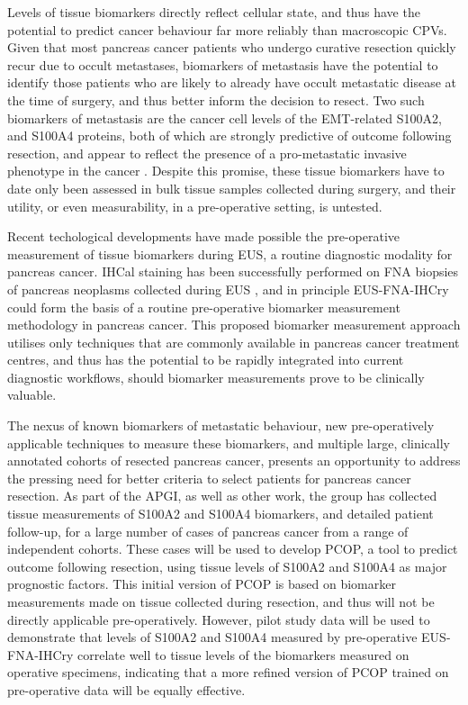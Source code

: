 \documentclass[dissertation.tex]{subfiles}
\begin{document}
Levels of tissue biomarkers directly reflect cellular state, and thus have the potential to predict cancer behaviour far more reliably than macroscopic \glspl{CPV}.  Given that most pancreas cancer patients who undergo curative resection quickly recur due to occult metastases, biomarkers of metastasis have the potential to identify those patients who are likely to already have occult metastatic disease at the time of surgery, and thus better inform the decision to resect.  Two such biomarkers of metastasis are the cancer cell levels of the \gls{EMT}-related S100A2, and S100A4 proteins, both of which are strongly predictive of outcome following resection, and appear to reflect the presence of a pro-metastatic invasive phenotype in the cancer \cite{Biankin2008, Tsukamoto2013, Lee2014}.  Despite this promise, these tissue biomarkers have to date only been assessed in bulk tissue samples collected during surgery, and their utility, or even measurability, in a pre-operative setting, is untested.

Recent techological developments have made possible the pre-operative measurement of tissue biomarkers during \gls{EUS}, a routine diagnostic modality for pancreas cancer.  \Gls{IHCal} staining has been successfully performed on \gls{FNA} biopsies of pancreas neoplasms collected during \gls{EUS} \cite{Popescu2012, Salla2009, Stelow2005}, and in principle \gls{EUS}-\gls{FNA}-\acrshort{IHCry} could form the basis of a routine pre-operative biomarker measurement methodology in pancreas cancer.  This proposed biomarker measurement approach utilises only techniques that are commonly available in pancreas cancer treatment centres, and thus has the potential to be rapidly integrated into current diagnostic workflows, should biomarker measurements prove to be clinically valuable.

The nexus of known biomarkers of metastatic behaviour, new pre-operatively applicable techniques to measure these biomarkers, and multiple large, clinically annotated cohorts of resected pancreas cancer, presents an opportunity to address the pressing need for better criteria to select patients for pancreas cancer resection.  As part of the \gls{APGI}, as well as other work, the group has collected tissue measurements of S100A2 and S100A4 biomarkers, and detailed patient follow-up, for a large number of cases of pancreas cancer from a range of independent cohorts.  These cases will be used to develop \gls{PCOP}, a tool to predict outcome following resection, using tissue levels of S100A2 and S100A4 as major prognostic factors.  This initial version of \gls{PCOP} is based on biomarker measurements made on tissue collected during resection, and thus will not be directly applicable pre-operatively.  However, pilot study data will be used to demonstrate that levels of S100A2 and S100A4 measured by pre-operative \gls{EUS}-\gls{FNA}-\acrshort{IHCry} correlate well to tissue levels of the biomarkers measured on operative specimens, indicating that a more refined version of \gls{PCOP} trained on pre-operative data will be equally effective.
\end{document}
